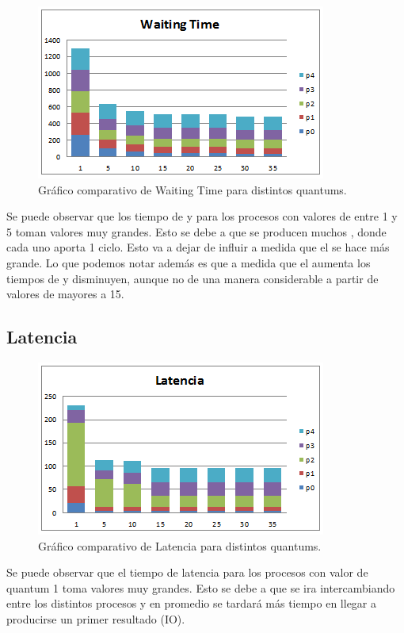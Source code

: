 \begin{figure}[H]
  \centering
    \includegraphics{img/waitingTime.png}
    \caption{Gr\'afico comparativo de Waiting Time para distintos quantums.}
\end{figure}

Se puede observar que los tiempo de \ta y \wt para los procesos con valores de \quantum entre 1 y 5 toman valores muy grandes. Esto se debe a que se producen muchos \cs, donde cada uno aporta 1 ciclo. Esto va a dejar de influir a medida que el \quantum se hace m\'as grande.
Lo que podemos notar adem\'as es que a medida que el \quantum aumenta los tiempos de \ta y \wt disminuyen, aunque no de una manera considerable a partir de valores de \quantum mayores a 15.

\subsection{Latencia}

\begin{figure}[H]
  \centering
    \includegraphics{img/latencia.png}
    \caption{Gr\'afico comparativo de Latencia para distintos quantums.}
\end{figure}

Se puede observar que el tiempo de latencia para los procesos con valor de quantum 1 toma valores muy grandes. Esto se debe a que se ira intercambiando entre los distintos procesos y en promedio se tardar\'a m\'as tiempo en llegar a producirse un primer resultado (IO). 

